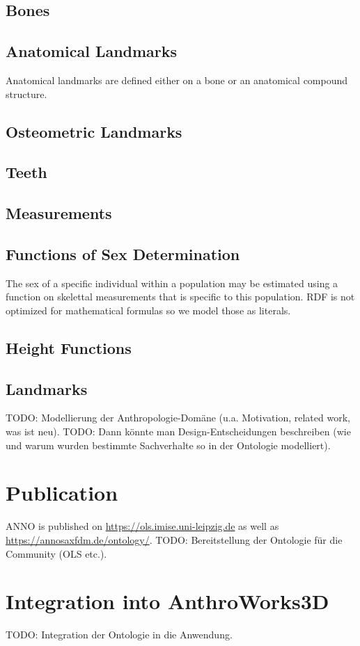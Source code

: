 \documentclass[sw]{iosart2x}
\newcommand{\aw}{AnthroWorks3D}
\begin{document}
\subsection{Bones}

\subsection{Anatomical Landmarks}
Anatomical landmarks are defined either on a bone or an anatomical compound structure.
\subsection{Osteometric Landmarks}

\subsection{Teeth}
\subsection{Measurements}
\subsection{Functions of Sex Determination}
The sex of a specific individual within a population may be estimated using a function on skelettal measurements that is specific to this population.
RDF is not optimized for mathematical formulas so we model those as literals.


\subsection{Height Functions}
\subsection{Landmarks}

TODO: Modellierung der Anthropologie-Domäne (u.a. Motivation, related work, was ist neu).
TODO: Dann könnte man Design-Entscheidungen beschreiben (wie und warum wurden bestimmte Sachverhalte so in der Ontologie modelliert).
\section{Publication}
ANNO is published on \url{https://ols.imise.uni-leipzig.de} as well as \url{https://annosaxfdm.de/ontology/}.
TODO: Bereitstellung der Ontologie für die Community (OLS etc.). 
\section{Integration into \aw}
TODO: Integration der Ontologie in die Anwendung.
\end{document}
